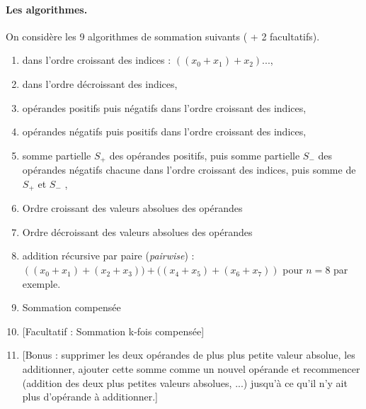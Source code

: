 \documentclass{exam}
\begin{document}
    \paragraph{\large Les algorithmes.} On considère les 9 algorithmes de sommation suivants ( + 2 facultatifs).
    \setcounter{enumii}{1}
    \begin{enumerate}[label=A\arabic*.]
        \item dans l'ordre croissant des indices : $((x_{0}+x_{1})+x_{2})...$,
        \item dans l'ordre décroissant des indices,
        \item opérandes positifs puis négatifs dans l'ordre croissant des indices,
        \item opérandes négatifs puis positifs dans l'ordre croissant des indices,
        \item somme partielle $S_{+}$ des opérandes positifs, puis somme partielle $S_{-}$ des opérandes
négatifs chacune dans l’ordre croissant des indices, puis somme de $S_{+}$ et $S_{-}$ ,
        \item Ordre croissant des valeurs absolues des opérandes
        \item Ordre décroissant des valeurs absolues des opérandes
        \item addition récursive par paire (\textit{pairwise}) : \\${\left((x_{0} + x_{1} ) + (x_{2} + x_{3} )) + ((x_{4} + x_{5} ) + (x_{6} + x_{7} )\right)}$ pour $n = 8$ par exemple.
        \item Sommation compensée
        \item {[Facultatif : Sommation k-fois compensée]}
        \item {[Bonus : supprimer les deux opérandes de plus plus petite valeur absolue, les additionner, ajouter cette somme comme un nouvel opérande et recommencer (addition des deux plus petites valeurs absolues, ...) jusqu’à ce qu’il n’y ait plus d’opérande à additionner.]}
    \end{enumerate}
\end{document}
